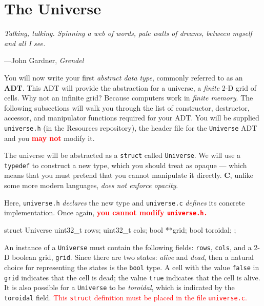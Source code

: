 \section{The Universe}

\epigraph{\emph{Talking, talking. Spinning a web of words, pale walls of dreams,
between myself and all I see.}} {---John Gardner, \emph{Grendel}}

You will now write your first \emph{abstract data type}, commonly referred to as
an \textbf{ADT}. This ADT will provide the abstraction for a universe, a
\emph{finite} 2-D grid of cells. Why not an infinite grid? Because computers
work in \emph{finite memory}. The following subsections will walk you through
the list of constructor, destructor, accessor, and manipulator functions
required for your ADT. You will be supplied \texttt{universe.h} (in the
Resources repository), the header file for the \texttt{Universe} ADT and you
\textcolor{red}{\textbf{may not}} modify it.

The universe will be abstracted as a \texttt{struct} called \texttt{Universe}.
We will use a \texttt{typedef} to construct a new type, which you should treat
as opaque --- which means that you must pretend that you cannot manipulate it
directly. \textbf{C}, unlike some more modern languages, \emph{does not enforce
opacity}.

Here, \texttt{universe.h} \emph{declares} the new type and \texttt{universe.c}
\emph{defines} its concrete implementation. Once again,
\textcolor{red}{\textbf{you cannot modify \texttt{universe.h.}}}

\begin{clisting}{}
struct Universe {
    uint32_t rows;
    uint32_t cols;
    bool **grid;
    bool toroidal;
};
\end{clisting}

An instance of a \texttt{Universe} must contain the following fields:
\texttt{rows}, \texttt{cols}, and a 2-D boolean grid, \texttt{grid}. Since there
are two states: \emph{alive} and \emph{dead}, then a natural choice for
representing the states is the \texttt{bool} type. A cell with the value
\texttt{false} in \texttt{grid} indicates that the cell is dead; the value
\texttt{true} indicates that the cell is alive. It is also possible for a
\texttt{Universe} to be \emph{toroidal}, which is indicated by the
\texttt{toroidal} field. \textcolor{red}{This \texttt{struct} definition must be
placed in the file \texttt{universe.c}.}

